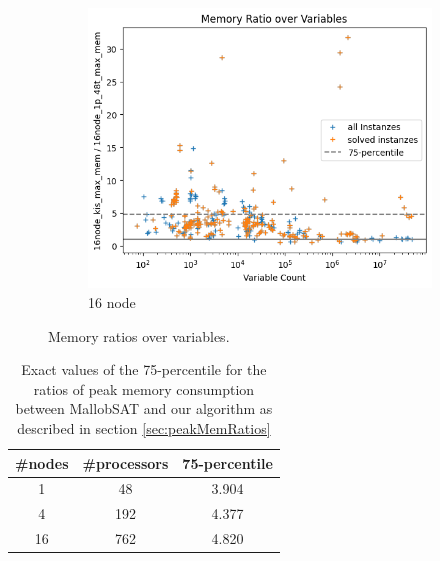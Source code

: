\documentclass[12pt,a4paper,twoside]{scrartcl}
\numberwithin{equation}{section}
\begin{document}
\begin{figure}
  \begin{subfigure}[c]{.4\textwidth}
    \center
    \includegraphics[scale=.3]{plots/16node_compare/mem_ratio_over_vars.png}
    \caption{16 node}
    \label{fig:memRatiosVars16node}
  \end{subfigure}
  \caption{Memory ratios over variables.}
  \label{fig:memRatiosVars}
\end{figure}




\begin{table}
  \center
  \begin{tabular}{ c|c|c }
    \#nodes & \#processors & 75-percentile \\
    \hline
    1  & 48  & 3.904\\
    \hline
    4  & 192 & 4.377\\
    \hline
    16 & 762 & 4.820
  \end{tabular}
  \caption{Exact values of the 75-percentile for the ratios of peak memory consumption between MallobSAT and our algorithm as described in section \ref{sec:peakMemRatios}}
  \label{tab:memRatioPercentiles}
\end{table}
\end{document}
